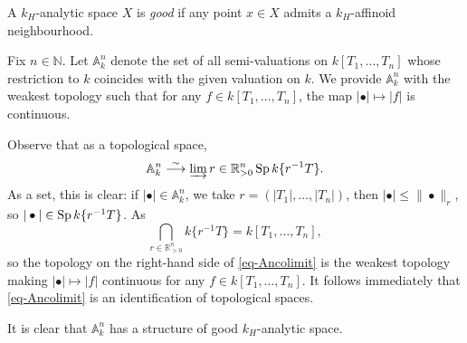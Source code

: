 \begin{definition}
    A $k_H$-analytic space $X$ is \emph{good} if any point $x\in X$ admits a $k_H$-affinoid neighbourhood.
\end{definition}

\begin{example}\label{ex-An}
    Fix $n\in \mathbb{N}$.
    Let $\mathbb{A}^n_k$ denote the set of all semi-valuations on $k[T_1,\ldots,T_n]$ whose restriction to $k$ coincides with the given valuation on $k$. We provide $\mathbb{A}^n_k$ with the weakest topology such that for any $f\in k[T_1,\ldots,T_n]$, the map $|\bullet|\mapsto |f|$ is continuous.

    Observe that as a topological space, 
    \begin{equation}\label{eq-Ancolimit}
        \mathbb{A}^n_k\stackrel{\sim}{\longrightarrow} \varinjlim{r\in \mathbb{R}^n_{>0}}\operatorname{Sp} k\{r^{-1}T\}.  
    \end{equation} 
    As a set, this is clear: if $|\bullet|\in \mathbb{A}^n_k$, we take $r=(|T_1|,\ldots,|T_n|)$, then $|\bullet|\leq \|\bullet\|_r$, so $|\bullet|\in \operatorname{Sp} k\{r^{-1}T\}$. 
    As
    \[
        \bigcap_{r\in \mathbb{R}^n_{>0}} k\{r^{-1}T\}=k[T_1,\ldots,T_n],
    \]
    so the topology on the right-hand side of \eqref{eq-Ancolimit} is the weakest topology making $|\bullet|\mapsto |f|$ continuous for any $f\in k[T_1,\ldots,T_n]$.
    It follows immediately that \eqref{eq-Ancolimit} is an identification of topological spaces. 

    It is clear that $\mathbb{A}^n_k$ has a structure of good $k_H$-analytic space.
\end{example}

\iffalse
\begin{lemma}
    Let $A$ be a $k$-affinoid algebra. Assume that the 
\end{lemma}

\begin{thm}
    Let $A$ be a $k$-affinoid algebra. Assume that $\Sp A$ is connected, then $\Sp A$ is path-connected.
\end{thm}
\begin{proof}
    
\end{proof}
\fi

